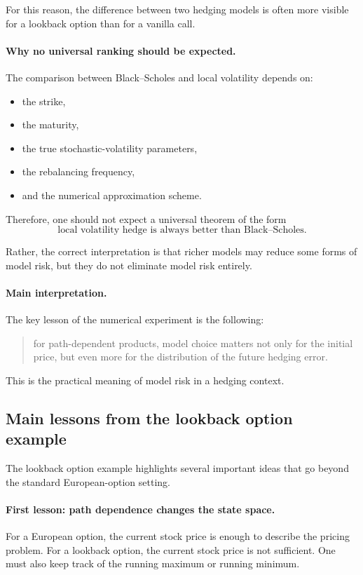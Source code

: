 \documentclass[11pt]{article}
\theoremstyle{plain}
\theoremstyle{definition}
\theoremstyle{remark}
\begin{document}
For this reason, the difference between two hedging models is often more
visible for a lookback option than for a vanilla call.

\paragraph{Why no universal ranking should be expected.}
The comparison between Black--Scholes and local volatility depends on:
\begin{itemize}[leftmargin=1.4em]
    \item the strike,
    \item the maturity,
    \item the true stochastic-volatility parameters,
    \item the rebalancing frequency,
    \item and the numerical approximation scheme.
\end{itemize}

Therefore, one should not expect a universal theorem of the form
\[
\text{local volatility hedge is always better than Black--Scholes}.
\]

Rather, the correct interpretation is that richer models may reduce some
forms of model risk, but they do not eliminate model risk entirely.

\paragraph{Main interpretation.}
The key lesson of the numerical experiment is the following:
\begin{quote}
for path-dependent products, model choice matters not only for the
initial price, but even more for the distribution of the future hedging
error.
\end{quote}

This is the practical meaning of model risk in a hedging context.

\subsection{Main lessons from the lookback option example}

The lookback option example highlights several important ideas that go
beyond the standard European-option setting.

\paragraph{First lesson: path dependence changes the state space.}
For a European option, the current stock price is enough to describe the
pricing problem.
For a lookback option, the current stock price is not sufficient.
One must also keep track of the running maximum or running minimum.
\end{document}
